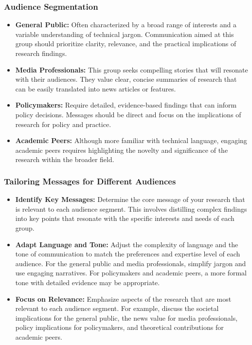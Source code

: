 \documentclass[
]{book}
\providecommand{\tightlist}{%
  \setlength{\itemsep}{0pt}\setlength{\parskip}{0pt}}
\begin{document}
\hypertarget{audience-segmentation}{%
\subsubsection*{Audience Segmentation}\label{audience-segmentation}}

\begin{itemize}
\tightlist
\item
  \textbf{General Public:} Often characterized by a broad range of interests and a variable understanding of technical jargon. Communication aimed at this group should prioritize clarity, relevance, and the practical implications of research findings.
\item
  \textbf{Media Professionals:} This group seeks compelling stories that will resonate with their audiences. They value clear, concise summaries of research that can be easily translated into news articles or features.
\item
  \textbf{Policymakers:} Require detailed, evidence-based findings that can inform policy decisions. Messages should be direct and focus on the implications of research for policy and practice.
\item
  \textbf{Academic Peers:} Although more familiar with technical language, engaging academic peers requires highlighting the novelty and significance of the research within the broader field.
\end{itemize}

\hypertarget{tailoring-messages-for-different-audiences}{%
\subsubsection*{Tailoring Messages for Different Audiences}\label{tailoring-messages-for-different-audiences}}

\begin{itemize}
\tightlist
\item
  \textbf{Identify Key Messages:} Determine the core message of your research that is relevant to each audience segment. This involves distilling complex findings into key points that resonate with the specific interests and needs of each group.
\item
  \textbf{Adapt Language and Tone:} Adjust the complexity of language and the tone of communication to match the preferences and expertise level of each audience. For the general public and media professionals, simplify jargon and use engaging narratives. For policymakers and academic peers, a more formal tone with detailed evidence may be appropriate.
\item
  \textbf{Focus on Relevance:} Emphasize aspects of the research that are most relevant to each audience segment. For example, discuss the societal implications for the general public, the news value for media professionals, policy implications for policymakers, and theoretical contributions for academic peers.
\end{itemize}
\end{document}
